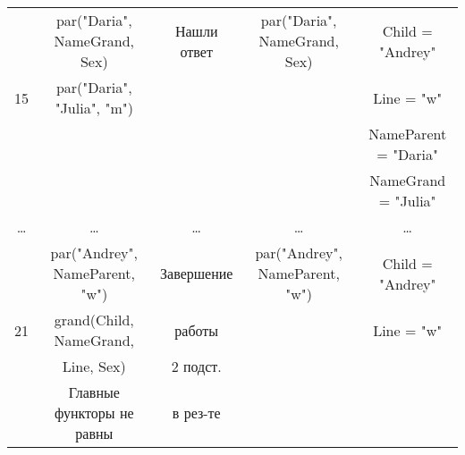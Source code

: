 \begin{landscape}
\begin{longtable}{|c|c|c|c|c|}
            \hline
              & par("Daria"{}, NameGrand, Sex) & Нашли ответ & par("Daria"{}, NameGrand, Sex) & Child = "Andrey"{}\\
            15 & par("Daria"{}, "Julia"{}, "m"{}) & & & Line = "w"{} \\
              & & & & NameParent = "Daria"{}\\
              & & & & NameGrand = "Julia"{}\\
            \hline
			\dots & \dots & \dots & \dots & \dots \\
			\hline
              & par("Andrey"{}, NameParent, "w"{}) & Завершение & par("Andrey"{}, NameParent, "w"{}) & Child = "Andrey"{} \\
            21 &grand(Child, NameGrand, & работы & & Line = "w" \\
              & Line, Sex) & 2 подст. & & \\
              & Главные функторы не равны & в рез-те & & \\
    \end{longtable}
\end{landscape}
